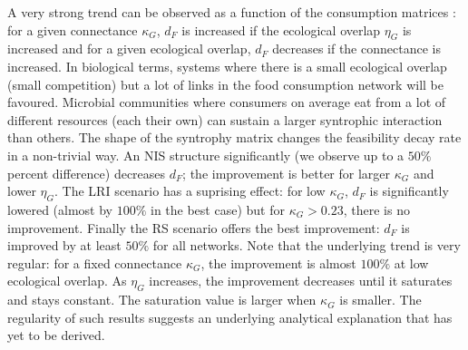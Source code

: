 \documentclass[12pt, titlepage]{report}
\begin{document}
  A very strong trend can be observed as a function of the consumption matrices%
  : for a given connectance $\kappa_G$, $d_F$ is increased if the ecological overlap $\eta_G$ is increased and for a given ecological overlap, $d_F$ decreases if the connectance is increased.
  In biological terms, systems where there is a small ecological overlap (\ie small competition) but a lot of links in the food consumption network will be favoured. Microbial communities where consumers on average eat from a lot of different resources (\ie each their own) can sustain a larger syntrophic interaction than others. The shape of the syntrophy matrix changes the feasibility decay rate in a non-trivial way. An NIS structure significantly (we observe up to a $50\%$ percent difference) decreases $d_F$; the improvement is better for larger $\kappa_G$ and lower $\eta_G$. The LRI scenario has a suprising effect: for low $\kappa_G$, $d_F$ is significantly lowered (almost by $100\%$ in the best case) but for $\kappa_G > 0.23$, there is no improvement. Finally the RS scenario offers the best improvement: $d_F$ is improved by at least $50\%$ for all networks. Note that the underlying trend is very regular: for a fixed connectance $\kappa_G$, the improvement is almost $100\%$ at low ecological overlap. As $\eta_G$ increases, the improvement decreases until it saturates and stays constant. The saturation value is larger when $\kappa_G$ is smaller. The regularity of such results suggests an underlying analytical explanation that has yet to be derived.

\end{document}
